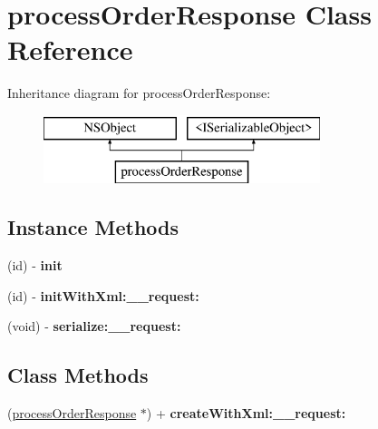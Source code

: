 \hypertarget{interfaceprocess_order_response}{}\section{process\+Order\+Response Class Reference}
\label{interfaceprocess_order_response}
Inheritance diagram for process\+Order\+Response\+:\begin{figure}[H]
\begin{center}
\leavevmode
\includegraphics[height=2.000000cm]{interfaceprocess_order_response}
\end{center}
\end{figure}
\subsection*{Instance Methods}
\begin{DoxyCompactItemize}
\item 
\hypertarget{interfaceprocess_order_response_a762967e3997ad8dd6456b535cf987f8e}{}(id) -\/ {\bfseries init}\label{interfaceprocess_order_response_a762967e3997ad8dd6456b535cf987f8e}

\item 
\hypertarget{interfaceprocess_order_response_af4742d92bc58af4ce6f359ee71005619}{}(id) -\/ {\bfseries init\+With\+Xml\+:\+\_\+\+\_\+request\+:}\label{interfaceprocess_order_response_af4742d92bc58af4ce6f359ee71005619}

\item 
\hypertarget{interfaceprocess_order_response_abb5c5eb2512db2521ddfbea2cfbd4e83}{}(void) -\/ {\bfseries serialize\+:\+\_\+\+\_\+request\+:}\label{interfaceprocess_order_response_abb5c5eb2512db2521ddfbea2cfbd4e83}

\end{DoxyCompactItemize}
\subsection*{Class Methods}
\begin{DoxyCompactItemize}
\item 
\hypertarget{interfaceprocess_order_response_a6d3deea3632ff561004bb35f4fd80841}{}(\hyperlink{interfaceprocess_order_response}{process\+Order\+Response} $\ast$) + {\bfseries create\+With\+Xml\+:\+\_\+\+\_\+request\+:}\label{interfaceprocess_order_response_a6d3deea3632ff561004bb35f4fd80841}

\end{DoxyCompactItemize}
